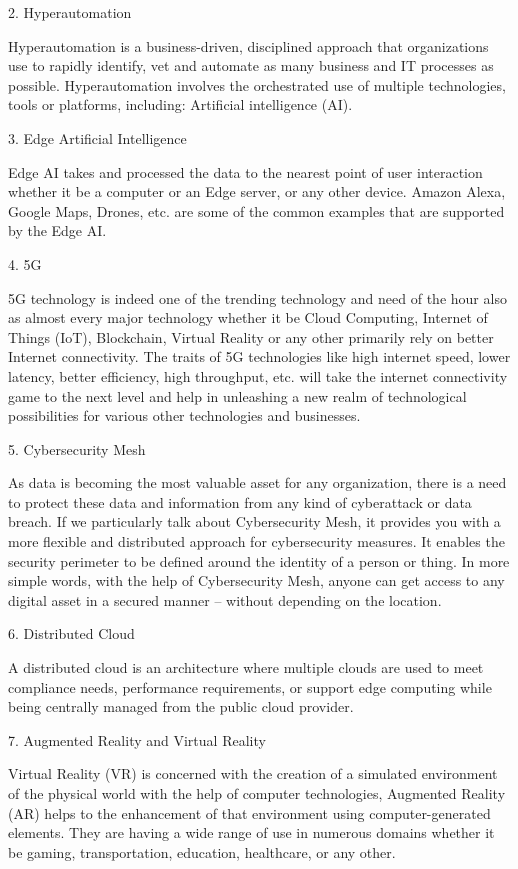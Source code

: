 \documentclass[11pt]{article}
\begin{document}
2. Hyperautomation

Hyperautomation is a business-driven, disciplined approach that organizations use to rapidly identify, vet and automate as many business and IT processes as possible. Hyperautomation involves the orchestrated use of multiple technologies, tools or platforms, including: Artificial intelligence (AI).




3. Edge Artificial Intelligence  

Edge AI takes and processed the data to the nearest point of user interaction whether it be a computer or an Edge server, or any other device. Amazon Alexa, Google Maps, Drones, etc. are some of the common examples that are supported by the Edge AI.




 
4. 5G

5G technology is indeed one of the trending technology and need of the hour also as almost every major technology whether it be Cloud Computing, Internet of Things (IoT), Blockchain, Virtual Reality or any other primarily rely on better Internet connectivity. The traits of 5G technologies like high internet speed, lower latency, better efficiency, high throughput, etc. will take the internet connectivity game to the next level and help in unleashing a new realm of technological possibilities for various other technologies and businesses. 

5. Cybersecurity Mesh

As data is becoming the most valuable asset for any organization, there is a need to protect these data and information from any kind of cyberattack or data breach. If we particularly talk about Cybersecurity Mesh, it provides you with a more flexible and distributed approach for cybersecurity measures. It enables the security perimeter to be defined around the identity of a person or thing. In more simple words, with the help of Cybersecurity Mesh, anyone can get access to any digital asset in a secured manner – without depending on the location.

6. Distributed Cloud

A distributed cloud is an architecture where multiple clouds are used to meet compliance needs, performance requirements, or support edge computing while being centrally managed from the public cloud provider.


7. Augmented Reality and Virtual Reality

Virtual Reality (VR) is concerned with the creation of a simulated environment of the physical world with the help of computer technologies, Augmented Reality (AR) helps to the enhancement of that environment using computer-generated elements. They are having a wide range of use in numerous domains whether it be gaming, transportation, education, healthcare, or any other.
\end{document}
